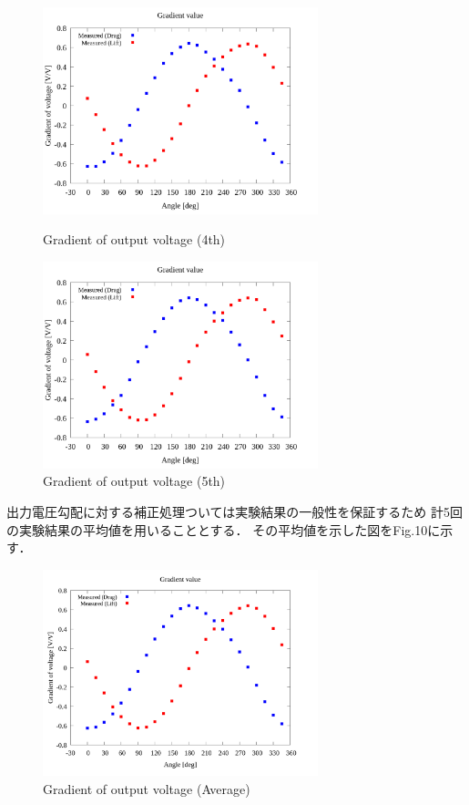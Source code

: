 \documentclass[twocolumn,a4j]{jsarticle}
\begin{document}
\begin{figure}[htbp]
    \footnotesize
    \begin{center}
        \includegraphics[width=80mm]{../../../02_workspace/result/2-4/plot/05/05_summary-wave.png}
        \caption{Gradient of output voltage (4th)}
        \includegraphics[width=80mm]{../../../02_workspace/result/2-5/plot/05/05_summary-wave.png}
        \caption{Gradient of output voltage (5th)}
    \end{center}
\end{figure}

出力電圧勾配に対する補正処理ついては実験結果の一般性を保証するため
計5回の実験結果の平均値を用いることとする．
その平均値を示した図をFig.10に示す．

\begin{figure}[htbp]
    \footnotesize
    \begin{center}
        \includegraphics[width=80mm]{../../../02_workspace/result/2-ex/plot/05/05_summary-wave.png}
        \caption{Gradient of output voltage (Average)}
    \end{center}
\end{figure}
\end{document}
